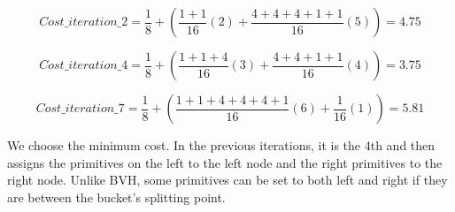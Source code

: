 \documentclass[11pt,a4paper]{article}
\begin{document}
\begin{equation}
Cost\_iteration\_2 =  \frac{1}{8} + (\frac{1+1}{16}(2) +\frac{4+4+4+1+1}{16}(5)) = 4.75
\end{equation}

\begin{equation}
Cost\_iteration\_4 =  \frac{1}{8} + (\frac{1+1+4}{16}(3) +\frac{4+4+1+1}{16}(4)) = 3.75
\end{equation}

\begin{equation}
Cost\_iteration\_7 =  \frac{1}{8} + (\frac{1+1+4+4+4+1}{16}(6) +\frac{1}{16}(1)) = 5.81
\end{equation}


We choose the minimum cost. In the previous iterations, it is the 4th and then assigns the primitives on the left to the left node and the right primitives to the right node. Unlike BVH, some primitives can be set to both left and right if they are between the bucket's splitting point.
\end{document}
